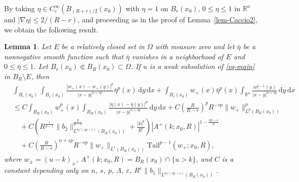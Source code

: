 \documentclass[11pt]{amsart}
\theoremstyle{plain}
\newtheorem{lemma}[theorem]{Lemma}
\theoremstyle{definition}
\numberwithin{equation}{section}
\begin{document}
By taking $\eta \in C^{\infty}_c(B_{(R+r)/2}(x_0))$ with $\eta=1$ on $B_r(x_0)$, $0 \leq \eta \leq 1$ in $\mathbb{R}^n$ and $|\nabla \eta|\leq 2/(R-r)$, and proceeding as in the proof of Lemma~\ref{lem-Caccio2}, we obtain the following result.

\begin{lemma}\label{lem-Caccio4}
Let $E$ be a relatively closed set in $\Omega$ with measure zero and let $\bar{\eta}$ be a nonnegative smooth function such that $\bar{\eta}$ vanishes in a neighborhood of $E$ and $0 \leq \bar{\eta} \leq 1$. Let $B_r(x_0) \Subset B_R(x_0) \subset \Omega$. If $u$ is a weak subsolution of \eqref{eq-main} in $B_R \setminus E$, then
\begin{equation*}
\begin{split}
&\int_{B_r(x_0)} \int_{B_r(x_0)} \frac{|w_+(x)-w_+(y)|^p}{|x-y|^{n+sp}} \bar{\eta}^p(x) \,\mathrm{d}y\,\mathrm{d}x + \int_{B_r(x_0)} w_+(x) \bar{\eta}^p(x) \int_{\mathbb{R}^n} \frac{w_-^{p-1}(y)}{|x-y|^{n+sp}} \,\mathrm{d}y \,\mathrm{d}x \\
&\leq C\int_{B_R(x_0)} w_+^p(x) \int_{B_R(x_0)} \frac{|\bar{\eta}(x)-\bar{\eta}(y)|^p}{|x-y|^{n+sp}} \,\mathrm{d}y \,\mathrm{d}x + C \left( \frac{R}{R-r} \right)^p R^{-sp} \|w_+\|_{L^p(B_R(x_0))}^p \\
&\quad + C \left( R^{\frac{\varepsilon}{p-1}}\|b_2\|^{\frac{p}{p-1}}_{L^{n/(sp-\varepsilon)}(B_R(x_0))} + \frac{|k|^p}{R^{\varepsilon}} \right) |A^+(k; x_0, R)|^{1-\frac{sp-\varepsilon}{n}} \\
&\quad + C \left( \frac{R}{R-r} \right)^{n+sp} R^{-sp} \|w_+\|_{L^1(B_R(x_0))} \mathrm{Tail}^{p-1}(w_+; x_0, R),
\end{split}
\end{equation*}
where $w_\pm=(u-k)_\pm$, $A^+(k; x_0, R)=B_R(x_0) \cap \{u>k\}$, and $C$ is a constant depending only on $n$, $s$, $p$, $\Lambda$, $\varepsilon$, $R^\varepsilon\|b_1\|_{L^{n/(sp-\varepsilon)}(B_R(x_0))}$.
\end{lemma}
\end{document}
